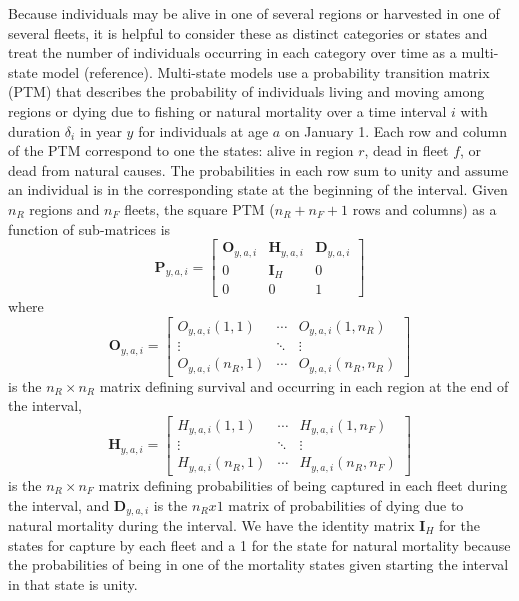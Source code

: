 \documentclass[
]{article}
\begin{document}
Because individuals may be alive in one of several regions or harvested
in one of several fleets, it is helpful to consider these as distinct
categories or states and treat the number of individuals occurring in
each category over time as a multi-state model (reference). Multi-state
models use a probability transition matrix (PTM) that describes the
probability of individuals living and moving among regions or dying due
to fishing or natural mortality over a time interval \(i\) with duration
\(\delta_i\) in year \(y\) for individuals at age \(a\) on January 1.
Each row and column of the PTM correspond to one the states: alive in
region \(r\), dead in fleet \(f\), or dead from natural causes. The
probabilities in each row sum to unity and assume an individual is in
the corresponding state at the beginning of the interval. Given \(n_R\)
regions and \(n_F\) fleets, the square PTM (\(n_R + n_F + 1\) rows and
columns) as a function of sub-matrices is \begin{equation}\label{eq:ptm}
  \mathbf{P}_{y,a,i} = \begin{bmatrix}
    \mathbf{O}_{y,a,i} & \mathbf{H}_{y,a,i} & \mathbf{D}_{y,a,i} \\
    0 & \mathbf{I}_{H} & 0\\
    0 & 0 & 1
  \end{bmatrix}
\end{equation} where \begin{equation*}
  \mathbf{O}_{y,a,i} = 
  \begin{bmatrix}
    O_{y,a,i}(1,1) & \cdots & O_{y,a,i}(1,n_R) \\
    \vdots & \ddots & \vdots \\
    O_{y,a,i}(n_R,1) & \cdots & O_{y,a,i}(n_R,n_R)
  \end{bmatrix}
\end{equation*} is the \(n_R \times n_R\) matrix defining survival and
occurring in each region at the end of the interval, \begin{equation*} 
  \mathbf{H}_{y,a,i} = 
  \begin{bmatrix}
    H_{y,a,i}(1,1) & \cdots & H_{y,a,i}(1,n_F) \\
    \vdots & \ddots & \vdots \\
    H_{y,a,i}(n_R,1) & \cdots & H_{y,a,i}(n_R,n_F)
  \end{bmatrix}
\end{equation*} is the \(n_R \times n_F\) matrix defining probabilities
of being captured in each fleet during the interval, and
\(\mathbf{D}_{y,a,i}\) is the \(n_R x 1\) matrix of probabilities of
dying due to natural mortality during the interval. We have the identity
matrix \(\mathbf{I}_{H}\) for the states for capture by each fleet and a
1 for the state for natural mortality because the probabilities of being
in one of the mortality states given starting the interval in that state
is unity.
\end{document}
